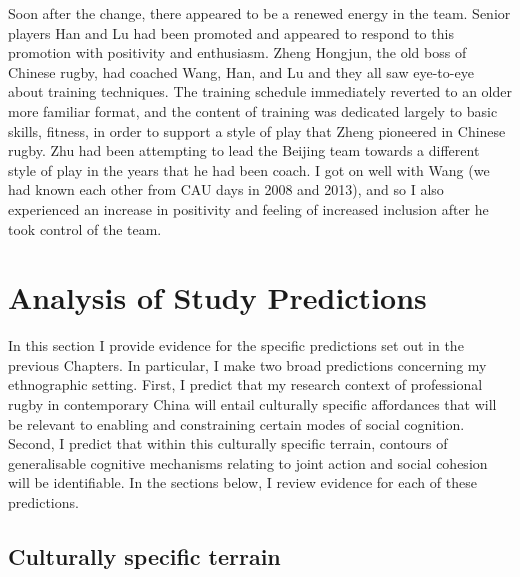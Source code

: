   Soon after the change, there appeared to be a renewed energy in the team.  Senior players Han and Lu had been promoted and appeared to respond to this promotion with positivity and enthusiasm.  Zheng Hongjun, the old boss of Chinese rugby, had coached Wang, Han, and Lu and they all saw eye-to-eye about training techniques.  The training schedule immediately reverted to an older more familiar format, and the content of training was dedicated largely to basic skills, fitness, in order to support a style of play that Zheng pioneered in Chinese rugby.  Zhu had been attempting to lead the Beijing team towards a different style of play in the years that he had been coach.  I got on well with Wang (we had known each other from CAU days in 2008 and 2013), and so I also experienced an increase in positivity and feeling of increased inclusion after he took control of the team.







  \section{Analysis of Study Predictions}

  In this section I provide evidence for the specific predictions set out in the previous Chapters.  In particular, I make two broad predictions concerning my ethnographic setting.  First, I predict that my research context of professional rugby in contemporary China will entail culturally specific affordances that will be relevant to enabling and constraining certain modes of social cognition.  Second, I predict that within this culturally specific terrain, contours of generalisable cognitive mechanisms relating to joint action and social cohesion will be identifiable.  In the sections below, I review evidence for each of these predictions.

    \subsection{Culturally specific terrain}

